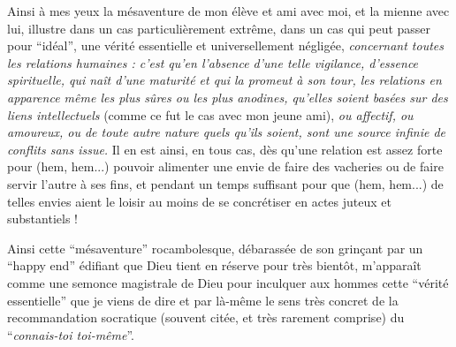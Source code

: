 Ainsi à mes yeux la mésaventure de mon élève et ami avec moi, et la mienne avec lui, illustre dans un cas particulièrement extrême, dans un cas qui peut passer pour ``idéal'', une vérité essentielle et universellement négligée, \textit{concernant toutes les relations humaines : c'est\unsure{,} qu'en l'absence d'une telle vigilance, d'essence spirituelle, qui naît d'une maturité et qui la promeut à son tour, les relations en apparence même les plus sûres ou les plus anodines, qu'elles soient basées sur des liens intellectuels} (comme ce fut le cas avec mon jeune ami), \textit{ou affectif, ou amoureux, ou de toute autre nature quels qu'ils soient, sont une source infinie de conflits sans issue.} Il en est ainsi, en tous cas, dès qu'une relation est assez forte pour (hem, hem...) pouvoir alimenter une envie de faire des vacheries ou de faire servir l'autre à ses fins, et pendant un temps suffisant pour que (hem, hem...) de telles envies aient le loisir au moins de se concrétiser en actes juteux et substantiels !

Ainsi cette ``mésaventure'' rocambolesque, débarassée de son grinçant par un ``happy end'' édifiant que Dieu tient en réserve pour très bientôt, m'apparaît comme une semonce magistrale de Dieu pour inculquer aux hommes cette ``vérité essentielle'' que je viens de dire et par là-même le sens très concret de la recommandation socratique (souvent citée, et très rarement comprise) du ``\textit{connais-toi toi-même}''.

